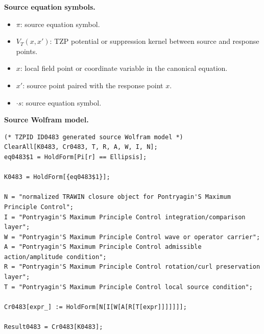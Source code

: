 \begin{minipage}[t]{0.49\linewidth}
\begingroup
\small
\raggedright
\textbf{Source equation symbols.}\par
\begin{itemize}[leftmargin=1.35em,itemsep=1pt,topsep=1pt,parsep=0pt]
    \item $\pi$: source equation symbol.
    \item $V_{T}(x,x')$: TZP potential or suppression kernel between source and response points.
    \item $x$: local field point or coordinate variable in the canonical equation.
    \item $x'$: source point paired with the response point $x$.
    \item $\cdot s$: source equation symbol.
\end{itemize}
\endgroup
\end{minipage}\hfill
\begin{minipage}[t]{0.47\linewidth}
\begingroup
\scriptsize
\raggedright
\textbf{Source Wolfram model.}\par
\begin{Verbatim}[fontsize=\tiny,breaklines=true,breakanywhere=true]
(* TZPID ID0483 generated source Wolfram model *)
ClearAll[K0483, Cr0483, T, R, A, W, I, N];
eq0483$1 = HoldForm[Pi[r] == Ellipsis];

K0483 = HoldForm[{eq0483$1}];

N = "normalized TRAWIN closure object for Pontryagin'S Maximum Principle Control";
I = "Pontryagin'S Maximum Principle Control integration/comparison layer";
W = "Pontryagin'S Maximum Principle Control wave or operator carrier";
A = "Pontryagin'S Maximum Principle Control admissible action/amplitude condition";
R = "Pontryagin'S Maximum Principle Control rotation/curl preservation layer";
T = "Pontryagin'S Maximum Principle Control local source condition";

Cr0483[expr_] := HoldForm[N[I[W[A[R[T[expr]]]]]]];

Result0483 = Cr0483[K0483];
\end{Verbatim}
\endgroup
\end{minipage}

